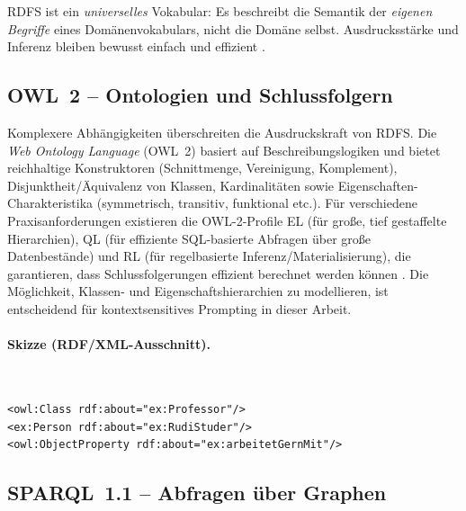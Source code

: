 RDFS ist ein \emph{universelles} Vokabular: Es beschreibt die Semantik der \emph{eigenen Begriffe} eines Domänenvokabulars, nicht die Domäne selbst. Ausdrucksstärke und Inferenz bleiben bewusst einfach und effizient \cite{RDFS11}.

\subsection{OWL~2 -- Ontologien und Schlussfolgern}
\label{subsec:owl}

Komplexere Abhängigkeiten überschreiten die Ausdruckskraft von RDFS. Die \emph{Web Ontology Language} (OWL~2) basiert auf Beschreibungslogiken und bietet reichhaltige Konstruktoren (Schnittmenge, Vereinigung, Komplement), Disjunktheit/Äquivalenz von Klassen, Kardinalitäten sowie Eigenschaften-Charakteristika (symmetrisch, transitiv, funktional etc.). Für verschiedene Praxisanforderungen existieren die OWL-2-Profile EL (für große, tief gestaffelte Hierarchien), QL (für effiziente SQL-basierte Abfragen über große Datenbestände) und RL (für regelbasierte Inferenz/Materialisierung), die garantieren, dass Schlussfolgerungen effizient berechnet werden können \cite{Hitzler,AntoniouVanHarmelen,OWL2Overview}. Die Möglichkeit, Klassen- und Eigenschaftshierarchien zu modellieren, ist entscheidend für kontextsensitives Prompting in dieser Arbeit.

\paragraph{Skizze (RDF/XML-Ausschnitt).}\mbox{}\\[-1.5ex]
\begin{lstlisting}
<owl:Class rdf:about="ex:Professor"/>
<ex:Person rdf:about="ex:RudiStuder"/>
<owl:ObjectProperty rdf:about="ex:arbeitetGernMit"/>
\end{lstlisting}

\subsection{SPARQL~1.1 -- Abfragen über Graphen}
\label{subsec:sparql}

